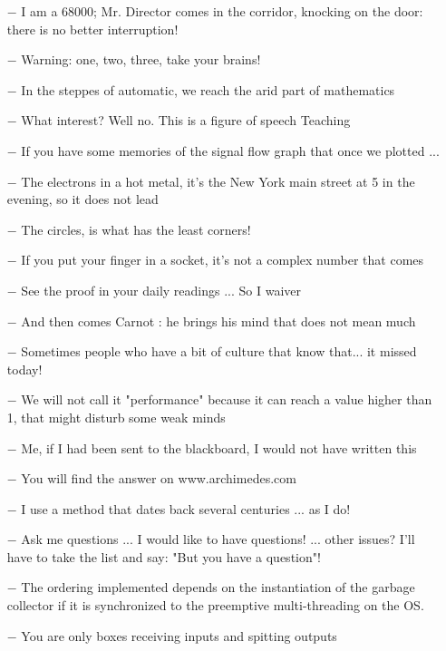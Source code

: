\begin{itemize}
	\item[$-$] I am a 68000; Mr. Director comes in the corridor, knocking on the door: there is no better interruption! 
	\item[$-$] Warning: one, two, three, take your brains!
	\item[$-$] In the steppes of automatic, we reach the arid part of mathematics 
	\item[$-$] What interest? Well no. This is a figure of speech Teaching 
	\item[$-$] If you have some memories of the signal flow graph that once we plotted ...
	\item[$-$] The electrons in a hot metal, it's the New York main street at 5 in the evening, so it does not lead
	\item[$-$] The circles, is what has the least corners!
	\item[$-$] If you put your finger in a socket, it's not a complex number that comes
	\item[$-$] See the proof in your daily readings ... So I waiver
	\item[$-$] And then comes Carnot : he brings his mind that does not mean much 
	\item[$-$] Sometimes people who have a bit of culture that know that... it missed today! 
	\item[$-$] We will not call it "performance" because it can reach a value higher than 1, that might disturb some weak minds
	\item[$-$] Me, if I had been sent to the blackboard, I would not have written this 
	\item[$-$] You will find the answer on www.archimedes.com
	\item[$-$] I use a method that dates back several centuries ... as I do!
	\item[$-$] Ask me questions ... I would like to have questions! ... other issues? I'll have to take the list and say: "But you have a question"!
	\item[$-$] The ordering implemented depends on the instantiation of the garbage collector if it is synchronized to the preemptive multi-threading on the OS.
	\item[$-$] You are only boxes receiving inputs and spitting outputs
\end{itemize}
	\begin{center}\underline{\hspace{5 cm}}\end{center}

